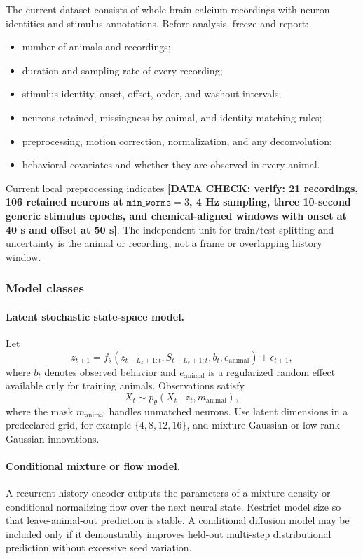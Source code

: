 \documentclass{article}
\newcommand{\dataplaceholder}[1]{%
  \textcolor{placeholderred}{\textbf{[DATA CHECK: #1]}}}
\theoremstyle{remark}
\begin{document}
The current dataset consists of whole-brain calcium recordings with neuron
identities and stimulus annotations. Before analysis, freeze and report:
\begin{itemize}[leftmargin=1.5em]
  \item number of animals and recordings;
  \item duration and sampling rate of every recording;
  \item stimulus identity, onset, offset, order, and washout intervals;
  \item neurons retained, missingness by animal, and identity-matching rules;
  \item preprocessing, motion correction, normalization, and any
  deconvolution;
  \item behavioral covariates and whether they are observed in every animal.
\end{itemize}
Current local preprocessing indicates
\dataplaceholder{verify: 21 recordings, 106 retained neurons at
\(\texttt{min\_worms}=3\), 4 Hz sampling, three 10-second generic stimulus
epochs, and chemical-aligned windows with onset at 40 s and offset at 50 s}.
The independent unit for train/test splitting and uncertainty is the animal or
recording, not a frame or overlapping history window.

\subsubsection{Model classes}

\paragraph{Latent stochastic state-space model.}
Let
\[
  z_{t+1}
  =
  f_\theta(
    z_{t-L_z+1:t},
    S_{t-L_s+1:t},
    b_t,
    e_{\mathrm{animal}}
  )
  +
  \epsilon_{t+1},
\]
where \(b_t\) denotes observed behavior and
\(e_{\mathrm{animal}}\) is a regularized random effect available only for
training animals. Observations satisfy
\[
  X_t\sim p_\theta(X_t\mid z_t,m_{\mathrm{animal}}),
\]
where the mask \(m_{\mathrm{animal}}\) handles unmatched neurons. Use latent
dimensions in a predeclared grid, for example
\(\{4,8,12,16\}\), and mixture-Gaussian or low-rank Gaussian innovations.

\paragraph{Conditional mixture or flow model.}
A recurrent history encoder outputs the parameters of a mixture density or
conditional normalizing flow over the next neural state. Restrict model size
so that leave-animal-out prediction is stable. A conditional diffusion model
may be included only if it demonstrably improves held-out multi-step
distributional prediction without excessive seed variation.
\end{document}
